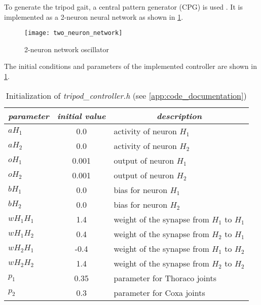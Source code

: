 To generate the tripod gait, a central pattern generator (CPG) is used \citep{unpub:ai3_lec3}. It is implemented as a 2-neuron neural network as shown in \cref{img:two_neuron_network}.

\begin{figure}[H]
  \centering
  \texttt{[image: two\_neuron\_network]}
  \caption{2-neuron network oscillator \citep{unpub:ai3_lec3}}
  \label{img:two_neuron_network}
\end{figure}

The initial conditions and parameters of the implemented controller are shown in \cref{tab:tripod_controller_init}.

\begin{table}[H]
\centering
\caption{Initialization of \textit{tripod\_controller.h} (see \cref{app:code_documentation})}
\label{tab:tripod_controller_init}
\begin{tabular}{|l|c|l|}
\hline
\multicolumn{1}{|c|}{\textit{parameter}} & \textit{initial value} & \multicolumn{1}{c|}{\textit{description}} \\ \hline
$ aH_1 $                            & 0.0                    & activity of neuron $ H_1 $                     \\ \hline
$ aH_2 $                            & 0.0                    & activity of neuron $ H_2 $                     \\ \hline
$ oH_1 $                            & 0.001                  & output of neuron $ H_1 $                       \\ \hline
$ oH_2 $                            & 0.001                  & output of neuron $ H_2 $                       \\ \hline
$ bH_1 $                            & 0.0                    & bias for neuron $ H_1 $                        \\ \hline
$ bH_2 $                             & 0.0                    & bias for neuron $ H_2 $                        \\ \hline
$ wH_1H_1 $                          & 1.4                    & weight of the synapse from $ H_1 $ to $ H_1 $       \\ \hline
$ wH_1H_2 $                          & 0.4                    & weight of the synapse from $ H_2 $ to $ H_1 $       \\ \hline
$ wH_2H_1 $                          & -0.4                   & weight of the synapse from $ H_1 $ to $ H_2 $       \\ \hline
$ wH_2H_2 $                           & 1.4                    & weight of the synapse from $ H_2 $ to $ H_2 $       \\ \hline
$ p_1 $                              & 0.35                   & parameter for Thoraco joints              \\ \hline
$ p_2 $                              & 0.3                    & parameter for Coxa joints                 \\ \hline
\end{tabular}
\end{table}

